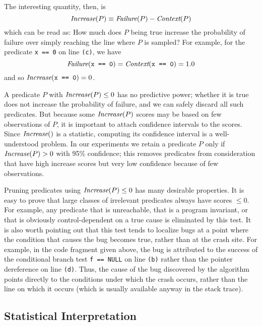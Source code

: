 The interesting quantity, then, is
\begin{equation*}
 \textit{Increase}(P) \equiv \textit{Failure}(P) - \textit{Context}(P) \label{eqn:1}
\end{equation*}
which can be read as: How much does $P$ being true increase the probability of failure
over simply reaching the line where $P$ is sampled?  For example, for the predicate {\tt x == 0} on line {\tt (c)},
we have
\[\textit{Failure}(\mbox{\tt x == 0}) = \textit{Context}(\mbox{\tt x == 0}) = 1.0 \]
and so $\textit{Increase}(\mbox{\tt x == 0}) = 0$.

A predicate $P$ with $\textit{Increase}(P) \leq 0$ has no predictive power; whether it is true does not increase the
probability of failure, and we can safely discard all such predicates.
But because some $\textit{Increase}(P)$ scores may be based on few observations of $P$, it is important
to attach confidence intervals to the scores.  Since $\textit{Increase}()$ is a statistic, computing
its confidence interval is a well-understood problem. In our experiments we retain a predicate $P$
only if $\textit{Increase}(P) > 0$ with 95\% confidence; this removes predicates from consideration that have high
increase scores but very low confidence because of few observations. 

Pruning predicates using $\textit{Increase}(P) \leq 0$ has many desirable
properties.  It is easy to prove that large classes of irrelevant
predicates always have scores $\leq 0$.  For example, any predicate
that is unreachable, that is a program invariant, or that is obviously
control-dependent on a true cause is eliminated by this test.  It is
also worth pointing out that this test tends to localize bugs at
a point where the condition that causes the bug becomes true, rather than at
the crash site.  For example, in the code fragment given above, the bug is
attributed to the success of the conditional branch test {\tt f ==
NULL} on line {\tt (b)} rather than the pointer dereference on line
{\tt (d)}.  Thus, the cause of the bug discovered by the algorithm
points directly to the conditions under which the crash occurs, rather than
the line on which it occurs (which is usually available anyway in the
stack trace).

\subsection{Statistical Interpretation}
\label{sec:statisticalinterpretation}


